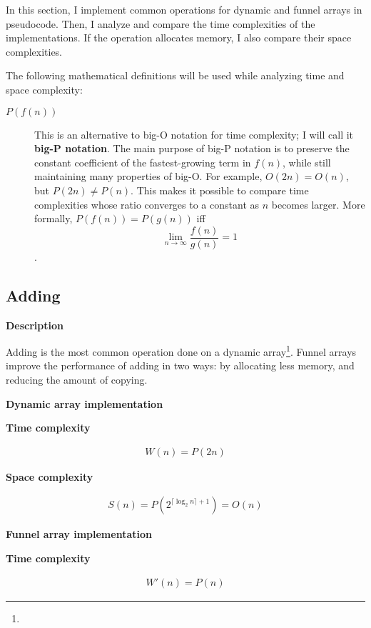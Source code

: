 \documentclass{article}
\newcommand{\descriptn}{\textbf{Description}}
\newcommand{\dynarrayimpl}{\textbf{Dynamic array implementation}}
\newcommand{\funarrayimpl}{\textbf{Funnel array implementation}}
\newcommand{\tcomplex}{\textbf{Time complexity}}
\newcommand{\scomplex}{\textbf{Space complexity}}
\newcommand{\spacefn}{S}
\newcommand{\nwritesfn}{W}
\newcommand{\nwritesnewfn}{\nwritesfn'}
\newcommand{\bigo}{O}
\newcommand{\biggo}{P}
\newcommand{\varnitems}{n}
\begin{document}
	In this section, I implement common operations for dynamic and funnel arrays in pseudocode. Then, I analyze and compare the time complexities of the implementations. If the operation allocates memory, I also compare their space complexities.
	
	The following mathematical definitions will be used while analyzing time and space complexity:
	
	\begin{description}
		\item[$\biggo(f(n))$] This is an alternative to big-O notation for time complexity; I will call it \textbf{big-P notation}.
			\subitem The main purpose of big-P notation is to preserve the constant coefficient of the fastest-growing term in $f(n)$, while still maintaining many properties of big-O. For example, $\bigo(2n) = \bigo(n)$, but $\biggo(2n) \neq \biggo(n)$. This makes it possible to compare time complexities whose ratio converges to a constant as $n$ becomes larger.
			\subitem More formally, $\biggo(f(n)) = \biggo(g(n))$ iff $$\lim_{n \to \infty} {\frac{f(n)}{g(n)}} = 1$$.
	\end{description}
	
	\subsection{Adding}
	
	\descriptn
	
	Adding is the most common operation done on a dynamic array\footnote{}. Funnel arrays improve the performance of adding in two ways: by allocating less memory, and reducing the amount of copying.
	
	\dynarrayimpl
	
	\tcomplex
	
	\begin{align*}
	\nwritesfn(\varnitems) = \biggo(2\varnitems)
	\end{align*}
	
	\scomplex
	
	\begin{align*}
	\spacefn(\varnitems) = \biggo(2^{\lceil \log_2 \varnitems \rceil + 1}) = \bigo(\varnitems)
	\end{align*}
	
	\funarrayimpl
	
	\tcomplex
	
	\begin{align*}
	\nwritesnewfn(\varnitems) = \biggo(\varnitems)
	\end{align*}
	
\end{document}
